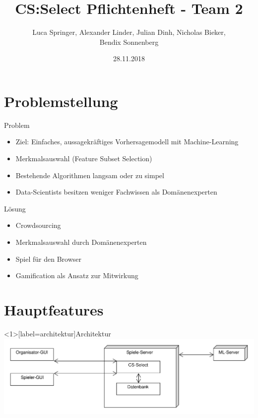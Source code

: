 \documentclass[xcolor=dvipsnames]{beamer}
\title[Team 2 - Pflichtenheft]{CS:Select Pflichtenheft - Team 2}
\author{Luca Springer, Alexander Linder, Julian Dinh, Nicholas Bieker,\\ Bendix Sonnenberg}
\date{28.11.2018}
\begin{document}
\begin{frame} %
  \titlepage
\end{frame}
\section{Problemstellung}
\begin{frame}{Problem}
    \begin{itemize}
        \item Ziel: Einfaches, aussagekräftiges Vorhersagemodell mit Machine-Learning \\
        \item Merkmalsauswahl (Feature Subset Selection) \\
        \item Bestehende Algorithmen langsam oder zu simpel \\
        \item Data-Scientists besitzen weniger Fachwissen als Domänenexperten \\
    \end{itemize}
\end{frame}
\begin{frame}{Lösung}
    \begin{itemize}
        \item Crowdsourcing \\
        \item Merkmalsauswahl durch Domänenexperten \\
        \item Spiel für den Browser \\
        \item Gamification als Ansatz zur Mitwirkung \\
    \end{itemize}
\end{frame}
\section{Hauptfeatures}
\begin{frame}<1>[label=architektur]{Architektur}
\center \includegraphics[scale=0.4]{img/Architektur.pdf}
\end{frame}
\end{document}
